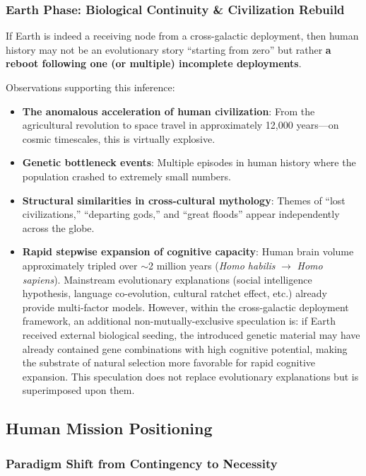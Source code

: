 \documentclass[aps,prd,twocolumn,superscriptaddress,nofootinbib]{revtex4-2}
\begin{document}
\subsubsection{Earth Phase: Biological Continuity \& Civilization Rebuild}\label{sec:earth-phase}

If Earth is indeed a receiving node from a cross-galactic deployment, then human history may not be an evolutionary story ``starting from zero'' but rather \textbf{a reboot following one (or multiple) incomplete deployments}.

Observations supporting this inference:

\begin{itemize}
  \item \textbf{The anomalous acceleration of human civilization}: From the agricultural revolution to space travel in approximately 12,000 years---on cosmic timescales, this is virtually explosive.
  \item \textbf{Genetic bottleneck events}: Multiple episodes in human history where the population crashed to extremely small numbers.
  \item \textbf{Structural similarities in cross-cultural mythology}: Themes of ``lost civilizations,'' ``departing gods,'' and ``great floods'' appear independently across the globe.
  \item \textbf{Rapid stepwise expansion of cognitive capacity}: Human brain volume approximately tripled over ${\sim}$2 million years (\textit{Homo habilis} $\to$ \textit{Homo sapiens}). Mainstream evolutionary explanations (social intelligence hypothesis, language co-evolution, cultural ratchet effect, etc.) already provide multi-factor models. However, within the cross-galactic deployment framework, an additional non-mutually-exclusive speculation is: if Earth received external biological seeding, the introduced genetic material may have already contained gene combinations with high cognitive potential, making the substrate of natural selection more favorable for rapid cognitive expansion. This speculation does not replace evolutionary explanations but is superimposed upon them.
\end{itemize}

\subsection{Human Mission Positioning}\label{sec:human-mission}

\subsubsection{Paradigm Shift from Contingency to Necessity}\label{sec:paradigm-shift}
\end{document}
